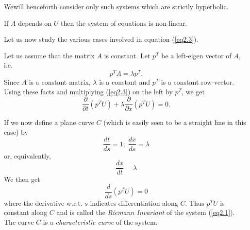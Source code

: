 We\pageoriginale will henceforth consider only such systems which are
strictly hyperbolic.

\setcounter{remark}{0}
\begin{remark}\label{chap2:rem2.1}
If $A$ depends on $U$ then the system of equations is non-linear.
\end{remark}

Let us now study the various cases involved in equation (\ref{eq2.3}).

\medskip
{} Let us assume that the matrix $A$ is
constant. Let $p^T$ be a left-eigen vector of $A$, i.e.
\begin{equation*}
p^T A = \lambda p^T. \tag{2.4}\label{eq2.4}
\end{equation*}
Since $A$ is a constant matrix, $\lambda$ is a constant and $p^T$ is a
constant row-vector. Using these facts and multiplying (\ref{eq2.3}) on the
left by $p^T$, we get 
\begin{equation*}
\frac{\partial}{\partial t} (p^TU) + \lambda \frac{\partial}{\partial
  x}(p^TU) = 0. \tag{2.5}\label{eq2.5}
\end{equation*}

If we now define a plane curve $C$ (which is easily seen to be a
straight line in this case) by
\begin{equation*}
\frac{dt}{ds} = 1; \; \frac{dx}{ds} = \lambda \tag{2.6}\label{eq2.6}
\end{equation*}
or, equivalently,
\begin{equation*}
\frac{dx}{dt} = \lambda \tag*{(2.6$'$)}\label{eq2.6'}
\end{equation*}
We then get
\begin{equation*}
\frac{d}{ds} (p^TU) = 0 \tag{2.7}\label{eq2.7}
\end{equation*}
where the derivative w.r.t. $s$ indicates differentiation along
$C$. Thus $p^TU$ is constant along $C$ and is called the {\em Riemann
  Invariant} of the system (\ref{eq2.1}). The curve $C$ is a {\em
  characteristic curve} of the system. 

